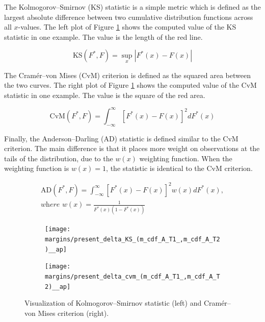 The Kolmogorov–Smirnov (KS) statistic \cite{Kolmogorov1933, Smirnoff1939} is a simple metric which is defined as the largest absolute difference between two cumulative distribution functions across all $x$-values. The left plot of Figure \ref{fig:ks-and-cvm} shows the computed value of the KS statistic in one example. The value is the length of the red line.

\begin{equation}\label{eq:KS}
	\text{KS}\left(F^*, F\right) = \sup_x\left|F^*(x)-F(x)\right|
\end{equation}

The Cramér–von Mises (CvM) criterion \cite{VonMises1928} is defined as the squared area between the two curves. The right plot of Figure \ref{fig:ks-and-cvm} shows the computed value of the CvM statistic in one example. The value is the square of the red area.

\begin{equation}\label{eq:CvM}
	\text{CvM}\left(F^*, F\right) = \int_{-\infty}^{\infty}{\left[ F^*(x) - F(x) \right]^{2} dF^*(x)}
\end{equation}

Finally, the Anderson–Darling (AD) statistic \cite{Anderson1952} is defined similar to the CvM criterion. The main difference is that it places more weight on observations at the tails of the distribution, due to the $w(x)$ weighting function. When the weighting function is $w(x)=1$, the statistic is identical to the CvM criterion.

\begin{eqnarray}\label{eq:AD}
	\nonumber
	\text{AD}\left(F^*, F\right) = \int_{-\infty}^{\infty}{\left[ F^*(x) - F(x)\right]^{2}w(x)dF^*(x)},\\ 
	\textit{where } w(x)= \frac{1}{F^*(x)\left(1-F^*(x)\right)}	
\end{eqnarray}

\begin{figure}[t]
	\centering
	\begin{subfigure}{.4\textwidth}
		\centering
		\texttt{[image: margins/present\_delta\_KS\_(m\_cdf\_A\_T1\_,m\_cdf\_A\_T2)\_\_ap]}
	\end{subfigure}%
	\begin{subfigure}{.4\textwidth}
		\centering
		\texttt{[image: margins/present\_delta\_cvm\_(m\_cdf\_A\_T1\_,m\_cdf\_A\_T2)\_\_ap]}
	\end{subfigure}
	\caption{Visualization of Kolmogorov–Smirnov statistic (left) and Cramér–von Mises criterion (right).}
	\label{fig:ks-and-cvm}
\end{figure}

